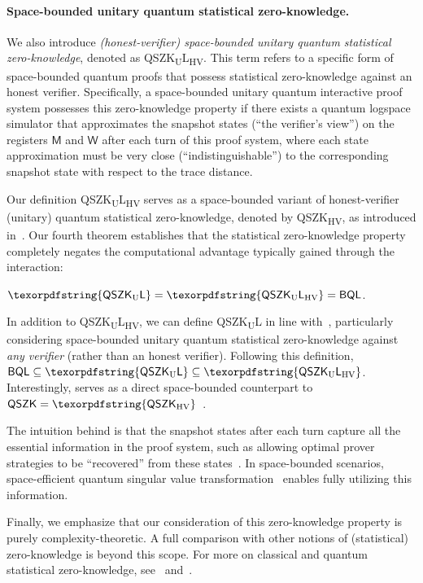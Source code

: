 \documentclass[11pt, a4paper]{article}
\numberwithin{equation}{section}
\numberwithin{figure}{section}
\newcommand{\QSZK}{\textnormal{\textsf{QSZK}}\xspace}
\newcommand{\HVQSZK}{\texorpdfstring{\textnormal{\textsf{QSZK}\textsubscript{HV}}}\xspace}
\newcommand{\QSZKUL}{\texorpdfstring{\textnormal{\textsf{QSZK}\textsubscript{\textnormal{U}}\textsf{L}}}\xspace}
\newcommand{\QSZKULHV}{\texorpdfstring{\textnormal{\textsf{QSZK}\textsubscript{\textnormal{U}}\textsf{L}}\textsubscript{\textnormal{HV}}}\xspace}
\newcommand{\BQL}{\textnormal{\textsf{BQL}}\xspace}
\newcommand{\sfM}{\mathsf{M}}
\newcommand{\sfW}{\mathsf{W}}
\begin{document}
\paragraph{Space-bounded unitary quantum statistical zero-knowledge.} We also introduce \textit{(honest-verifier) space-bounded unitary quantum statistical zero-knowledge}, denoted as \QSZKULHV{}. This term refers to a specific form of space-bounded quantum proofs that possess statistical zero-knowledge against an honest verifier. 
Specifically, a space-bounded unitary quantum interactive proof system possesses this zero-knowledge property if there exists a quantum logspace simulator that approximates the snapshot states (``the verifier's view'') on the registers $\sfM$ and $\sfW$ after each turn of this proof system, where each state approximation must be very close (``indistinguishable'') to the corresponding snapshot state with respect to the trace distance. 

Our definition \QSZKULHV{} serves as a space-bounded variant of honest-verifier (unitary) quantum statistical zero-knowledge, denoted by \HVQSZK{}, as introduced in~\cite{Wat02QSZK}. 
Our fourth theorem establishes that the statistical zero-knowledge property completely negates the computational advantage typically gained through the interaction:
\begin{theorem}
    \label{thm:QSZKL-eq-BQL-informal}
    $\QSZKUL = \QSZKULHV = \BQL$.
\end{theorem}

In addition to \QSZKULHV{}, we can define \QSZKUL{} in line with~\cite{Wat09QSZK}, particularly considering space-bounded unitary quantum statistical zero-knowledge against \textit{any verifier} (rather than an honest verifier). Following this definition, $\BQL \subseteq \QSZKUL \subseteq \QSZKULHV$. Interestingly,  serves as a direct space-bounded counterpart to $\QSZK = \HVQSZK$~\cite{Wat09QSZK}.

The intuition behind  is that the snapshot states after each turn capture all the essential information in the proof system, such as allowing optimal prover strategies to be ``recovered'' from these states~\cite[Section 7]{MY23}. In space-bounded scenarios, space-efficient quantum singular value transformation~\cite{LGLW23} enables fully utilizing this information.

Finally, we emphasize that our consideration of this zero-knowledge property is purely complexity-theoretic. A full comparison with other notions of (statistical) zero-knowledge is beyond this scope. For more on classical and quantum statistical zero-knowledge, see~\cite{Vad99} and~\cite[Chapter 5]{VW16}. 
\end{document}
